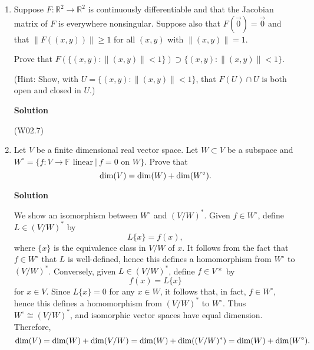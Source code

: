\documentclass{article}
\def\dim{\mathop{\rm dim}\nolimits}
\newcommand{\matrixiiibyiii}[9]{\left( \begin{array}{ccc} #1 & #2 & #3 \\ #4 & #5 & #6 \\ #7 & #8 & #9 \end{array} \right)}
\begin{document}
\begin{enumerate}
{\bf Solution}

Without loss of generality, suppose \(\frac{\partial f}{\partial x} \neq 0\) at \(0\).  Set \(h(x,y,z) = y\) and \(g(x,y,z) = z\).  Set
\[F(x,y,z) = (f(x,y,z), g(x,y,z), h(x,y,z));\]
then
\[F'(x,y,z) = \matrixiiibyiii{\frac{\partial f}{\partial x}}{\frac{\partial f}{\partial y}}{\frac{\partial f}{\partial z}}{0}{1}{0}{0}{0}{1}\]
is nonsingular at \(0\), hence the Inverse Function Theorem guarantees open sets \(U\) and \(V\) of \(\mathbb{R}^3\) with \(0 \in U\), \(F(0) \in V\), \(F\) is one-to-one on \(U\), and \(F(U) = V\).



\item Suppose \(F : \mathbb{R}^2 \to \mathbb{R}^2\) is continuously differentiable and that the Jacobian matrix of \(F\) is everywhere nonsingular.  Suppose also that \(F(\vec{0}) = \vec{0}\) and that \(\|F((x,y))\| \geq 1\) for all \((x,y)\) with \(\|(x,y)\| = 1\).

Prove that \(F(\{(x,y) : \|(x,y)\| < 1\}) \supset \{(x,y) : \|(x,y)\| < 1\}\).

(Hint:  Show, with \(U = \{(x,y) : \|(x,y)\| < 1\}\), that \(F(U) \cap U\) is both open and closed in \(U\).)

{\bf Solution}

(W02.7)



\item Let \(V\) be a finite dimensional real vector space.  Let \(W \subset V\) be a subspace and \(W^{\circ} = \{f : V \to \mathbb{F} \text{ linear} \ | \ f = 0 \text{ on } W\}\).  Prove that
\[\dim(V) = \dim(W) + \dim(W^{\circ}).\]

{\bf Solution}

We show an isomorphism between \(W^{\circ}\) and \((V/W)^*\).  Given \(f \in W^{\circ}\), define \(L \in (V/W)^*\) by
\[L\{x\} = f(x),\]
where \(\{x\}\) is the equivalence class in \(V/W\) of \(x\).  It follows from the fact that \(f \in W^{\circ}\) that \(L\) is well-defined, hence this defines a homomorphism from \(W^{\circ}\) to \((V/W)^*\).  Conversely, given \(L \in (V/W)^*\), define \(f \in V*\) by
\[f(x) = L\{x\}\]
for \(x \in V\).  Since \(L\{x\} = 0\) for any \(x \in W\), it follows that, in fact, \(f \in W^{\circ}\), hence this defines a homomorphism from \((V/W)^*\) to \(W^{\circ}\).  Thus \(W^{\circ} \cong (V/W)^*\), and isomorphic vector spaces have equal dimension.  Therefore,
\[\dim(V) = \dim(W) + \dim(V/W) = \dim(W) + \dim((V/W)^*) = \dim(W) + \dim(W^{\circ}).\]




\end{enumerate}
\end{document}
